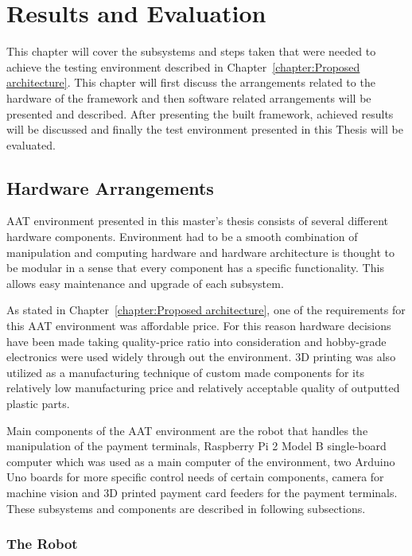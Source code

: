
\chapter{Results and Evaluation}
\label{chapter:Results and Evaluation}

This chapter will cover the subsystems and steps taken that were needed to achieve the testing environment described in Chapter~\ref{chapter:Proposed architecture}. This chapter will first discuss the arrangements related to the hardware of the framework and then software related arrangements will be presented and described. After presenting the built framework, achieved results will be discussed and finally the test environment presented in this Thesis will be evaluated.

\section{Hardware Arrangements}
\label{section:Hardware arrangements}

AAT environment presented in this master's thesis consists of several different hardware components. Environment had to be a smooth combination of manipulation and computing hardware and hardware architecture is thought to be modular in a sense that every component has a specific functionality. This allows easy maintenance and upgrade of each subsystem.

As stated in Chapter~\ref{chapter:Proposed architecture}, one of the requirements for this AAT environment was affordable price. For this reason hardware decisions have been made taking quality-price ratio into consideration and hobby-grade electronics were used widely through out the environment. 3D printing was also utilized as a manufacturing technique of custom made components for its relatively low manufacturing price and relatively acceptable quality of outputted plastic parts.

Main components of the AAT environment are the robot that handles the manipulation of the payment terminals, Raspberry Pi 2 Model B single-board computer which was used as a main computer of the environment, two Arduino Uno boards for more specific control needs of certain components, camera for machine vision and 3D printed payment card feeders for the payment terminals. These subsystems and components are described in following subsections.

\subsection{The Robot}
\label{subsection:Robot}

